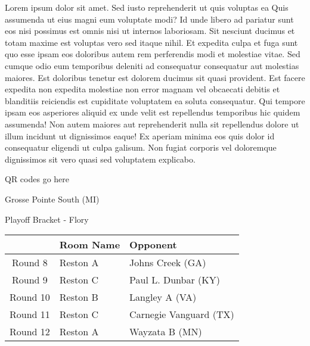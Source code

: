 \documentclass{article}%
\begin{document}
\vspace*{8pt}%
\linebreak%
\newline%
\newline%
Lorem ipsum dolor sit amet. Sed iusto reprehenderit ut quis voluptas ea Quis assumenda ut eius magni eum voluptate modi? Id unde libero ad pariatur sunt eos nisi possimus est omnis nisi ut internos laboriosam. Sit nesciunt ducimus et totam maxime est voluptas vero sed itaque nihil. Et expedita culpa et fuga sunt quo esse ipsam eos doloribus autem rem perferendis modi et molestiae vitae.\newline%
\newline%
Sed cumque odio eum temporibus deleniti ad consequatur consequatur aut molestias maiores. Est doloribus tenetur est dolorem ducimus sit quasi provident. Est facere expedita non expedita molestiae non error magnam vel obcaecati debitis et blanditiis reiciendis est cupiditate voluptatem ea soluta consequatur. Qui tempore ipsam eos asperiores aliquid ex unde velit est repellendus temporibus hic quidem assumenda!\newline%
\newline%
Non autem maiores aut reprehenderit nulla sit repellendus dolore ut illum incidunt ut dignissimos eaque! Ex aperiam minima eos quis dolor id consequatur eligendi ut culpa galisum. Non fugiat corporis vel doloremque dignissimos sit vero quasi sed voluptatem explicabo.\newline%
\newline%
%
\vspace*{30pt}%
\begin{center}%
\begin{Huge}%
QR codes go here%
\end{Huge}%
\end{center}%
\newpage%
\begin{center}%
\begin{Huge}%
Grosse Pointe South (MI)%
\end{Huge}%
\vspace*{8pt}%
\linebreak%
\begin{Large}%
Playoff Bracket {-} Flory%
\end{Large}%
\end{center}%
%
\begin{tabularx}{\textwidth}{|c|Y|Y|}%
\hline%
&Room Name&Opponent\\%
\hline%
Round 8&Reston A&Johns Creek (GA)\\%
Round 9&Reston C&Paul L. Dunbar (KY)\\%
Round 10&Reston B&Langley A (VA)\\%
Round 11&Reston C&Carnegie Vanguard (TX)\\%
Round 12&Reston A&Wayzata B (MN)\\%
\hline%
\end{tabularx}%
\end{document}
